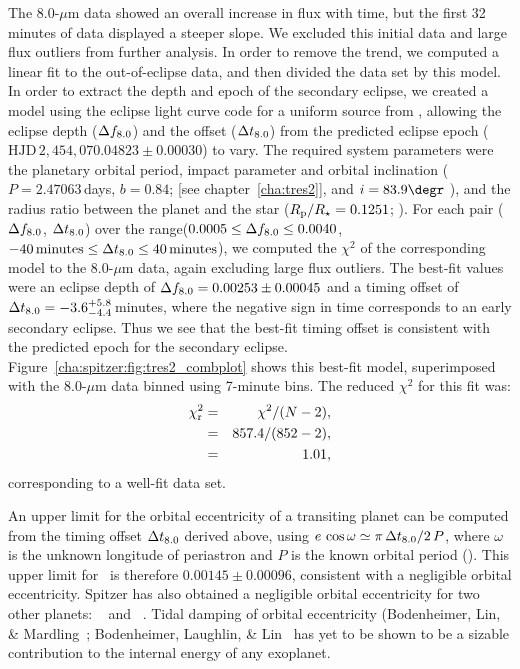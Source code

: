 The 8.0-$\mu$m data showed an overall increase in flux with time, but the first 32 minutes of data displayed a steeper slope.
We excluded this initial data and large flux outliers from further analysis.
In order to remove the trend, we computed a linear fit to the out-of-eclipse data, and then divided the data set by this model. 
In order to extract the depth and epoch of the secondary eclipse, we created a model using the eclipse light curve code for a uniform source from \citet{Mandel_Agol:apjl:2002a}, allowing the eclipse depth ($\Delta f_{\rm {8.0}}$) and the offset ($\Delta t_{\rm {8.0}} $) from the predicted eclipse epoch (\mbox{$\mathrm{HJD}\,2,\!454,\!070.04823\pm0.00030$}) to vary. 
The required system parameters were the planetary orbital period, impact parameter and orbital inclination (\mbox{$P=2.47063$\,days}, \mbox{$b=0.84$}; \citealt{ODonovan_Charbonneau_Mandushev:apjl:2006a} [see chapter~\ref{cha:tres2}], and \mbox{$i=83.9\degr$} \citealt{Holman_Winn_Latham:apj:2007a}), and the radius ratio between the planet and the star (\mbox{$R_{\rm p}/R_{\star}=0.1251$};  \citealt{Holman_Winn_Latham:apj:2007a}). 
For each pair ($\Delta f_{\rm {8.0}}$, $\Delta t_{\rm {8.0}}$) over the range($0.0005 \le \Delta f_{\rm 8.0} \le 0.0040$, $-40\,\mathrm{minutes} \le \Delta t_{\rm {8.0}} \le 40\,\mathrm{minutes}$), we computed the $\chi^{2}$ of the corresponding model to the 8.0-$\mu$m data, again excluding large flux outliers. 
The best-fit values were an eclipse depth of $\Delta f_{\rm {8.0}} = 0.00253 \pm 0.00045$ and a timing offset of $\Delta t_{\rm {8.0}} = -3.6^{+5.8}_{-4.4}$\,minutes, where the negative sign in time corresponds to an early secondary eclipse.
Thus we see that the best-fit timing offset is consistent with the predicted epoch for the secondary eclipse. 
Figure~\ref{cha:spitzer:fig:tres2_combplot} shows this best-fit model, superimposed with the 8.0-$\mu$m data binned using 7-minute bins. 
The reduced $\chi^{2}$ for this fit was:
\begin{eqnarray*}
\chi_{\rm r}^{2} & = & \chi^{2}/(N-2), \\
 & = & 857.4/(852-2), \\ 
 & = & 1.01, 
\end{eqnarray*}
corresponding to a well-fit data set.

An upper limit for the orbital eccentricity of a transiting planet can be computed from the timing offset $\Delta t_{\rm {8.0}}$ derived above, using $e \, \cos{\omega} \simeq \pi \, \Delta t_{\rm 8.0}/2 \, P$, where $\omega$ is the unknown longitude of periastron and $P$ is the known orbital period (\citealp[see equation~4 of][]{Charbonneau_Allen_Megeath:apj:2005a}). 
This upper limit for \tresTwo\ is therefore \mbox{$0.00145\pm0.00096$}, consistent with a negligible orbital eccentricity. 
Spitzer has also obtained a negligible orbital eccentricity for two other planets: \hdTZNb\ \citep{Deming_Seager_Richardson:nat:2005a} and \tresOne\ \citep{Charbonneau_Allen_Megeath:apj:2005a}.
Tidal damping of orbital eccentricity (Bodenheimer, Lin, \& Mardling~\citeyear{Bodenheimer_Lin_Mardling:apj:2001a}; Bodenheimer, Laughlin, \& Lin~\citeyear{Bodenheimer_Laughlin_Lin:apj:2003a} has yet to be shown to be a sizable contribution to the internal energy of any exoplanet. 

